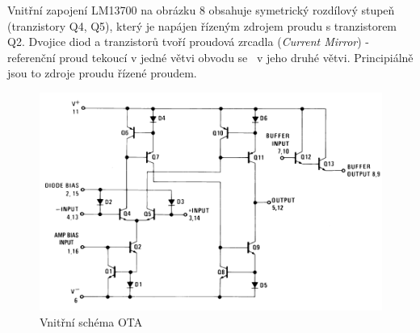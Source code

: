 \documentclass[twoside]{article}
\begin{document}
\noindent Vnitřní zapojení LM13700 na obrázku 8 obsahuje symetrický rozdílový stupeň (tranzistory Q4, Q5), který je napájen řízeným zdrojem proudu s tranzistorem Q2. Dvojice diod a tranzistorů tvoří proudová zrcadla (\textit{Current Mirror}) - referenční proud tekoucí v jedné větvi obvodu se  ~v jeho druhé větvi. Principiálně jsou to zdroje proudu řízené proudem. 
\begin{figure}[H]
\centering
\includegraphics[scale=0.75]{image5.png}
\caption{Vnitřní schéma OTA \cite{6}}
\end{figure}
\end{document}
